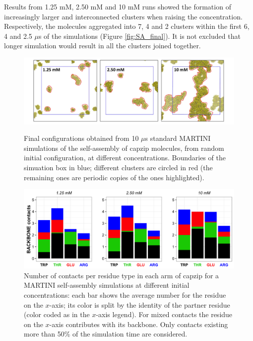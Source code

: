 Results from 1.25 mM, 2.50 mM and 10 mM runs showed the formation of increasingly larger and interconnected clusters when raising the concentration. Respectively, the molecules aggregated into 7, 4 and 2 clusters within the first 6, 4 and 2.5 $\mu$s of the simulations (Figure \ref{fig:SA_final}). It is not excluded that longer simulation would result in all the clusters joined together.
%
\begin{figure}
\centering
\includegraphics[width=0.95\linewidth]{3results_capsule/pics/final_SA.png} 
\caption[(SI) Self-assembly simulations, final configurations]{Final configurations obtained from 10 $\mu$s standard MARTINI simulations of the self-assembly of capzip molecules, from random initial configuration, at different concentrations. Boundaries of the simuation box in blue; different clusters are circled in red (the remaining ones are periodic copies of the ones highlighted).}
\label{fig:SA_final}
\vspace{0.7cm}
\includegraphics[width=0.95\linewidth]{3results_capsule/pics/contacts_SA.png} 
\caption[(SI) Self-assembly simulations: contacts]{Number of contacts per residue type in each arm of capzip for a MARTINI self-assembly simulations at different initial concentrations: each bar shows the average number for the residue on the $x$-axis; its color is split by the identity of the partner residue (color coded as in the $x$-axis legend). For mixed contacts the residue on the $x$-axis contributes with its backbone. Only contacts existing more than 50\% of the simulation time are considered.}
\label{fig:SA_contacts}
\vspace{0.7cm}

\end{figure}
